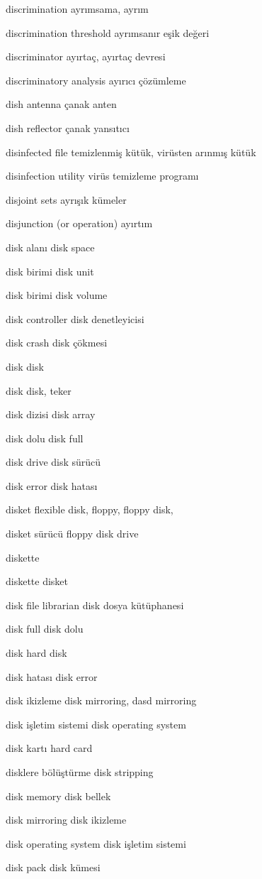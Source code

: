 \documentclass[12pt,fleqn]{article}\usepackage{../../common}
\begin{document}
discrimination ayrımsama, ayrım

discrimination threshold ayrımsanır eşik değeri

discriminator ayırtaç, ayırtaç devresi

discriminatory analysis ayırıcı çözümleme

dish antenna çanak anten

dish reflector çanak yansıtıcı

disinfected file temizlenmiş kütük, virüsten arınmış kütük

disinfection utility virüs temizleme programı

disjoint sets ayrışık kümeler

disjunction (or operation) ayırtım

disk alanı disk space

disk birimi disk unit

disk birimi disk volume

disk controller disk denetleyicisi

disk crash disk çökmesi

disk disk

disk disk, teker

disk dizisi disk array

disk dolu disk full

disk drive disk sürücü

disk error disk hatası

disket flexible disk, floppy, floppy disk,

disket sürücü floppy disk drive

diskette

diskette disket

disk file librarian disk dosya kütüphanesi

disk full disk dolu

disk hard disk

disk hatası disk error

disk ikizleme disk mirroring, dasd mirroring

disk işletim sistemi disk operating system

disk kartı hard card

disklere bölüştürme disk stripping

disk memory disk bellek

disk mirroring disk ikizleme

disk operating system disk işletim sistemi

disk pack disk kümesi
\end{document}

